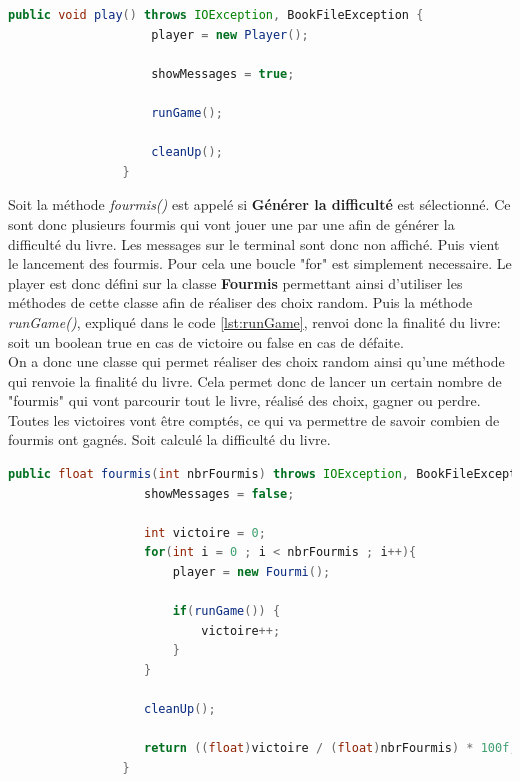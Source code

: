 			\begin{lstlisting}[gobble=16, language=java, caption=play()]
				public void play() throws IOException, BookFileException {
					player = new Player();

					showMessages = true;

					runGame();

					cleanUp();
				}
			\end{lstlisting}

			Soit la méthode \textit{fourmis()} est appelé si \textbf{Générer la difficulté} est sélectionné. Ce sont donc plusieurs fourmis qui vont jouer une par une afin de générer la difficulté du livre. Les messages sur le terminal sont donc non affiché. Puis vient le lancement des fourmis. Pour cela une boucle "for" est simplement necessaire. Le player est donc défini sur la classe \textbf{Fourmis} permettant ainsi d'utiliser les méthodes de cette classe afin de réaliser des choix random. Puis la méthode \textit{runGame()}, expliqué dans le code \ref{lst:runGame}, renvoi donc la finalité du livre: soit un boolean true en cas de victoire ou false en cas de défaite.\\
			On a donc une classe qui permet réaliser des choix random ainsi qu'une méthode qui renvoie la finalité du livre. Cela permet donc de lancer un certain nombre de "fourmis" qui vont parcourir tout le livre, réalisé des choix, gagner ou perdre. Toutes les victoires vont être comptés, ce qui va permettre de savoir combien de fourmis ont gagnés. Soit calculé la difficulté du livre.

			\begin{lstlisting}[gobble=16, language=java, caption=fourmis()]
				public float fourmis(int nbrFourmis) throws IOException, BookFileException {
				   showMessages = false;

				   int victoire = 0;
				   for(int i = 0 ; i < nbrFourmis ; i++){
					   player = new Fourmi();

					   if(runGame()) {
						   victoire++;
					   }
				   }

				   cleanUp();

				   return ((float)victoire / (float)nbrFourmis) * 100f;
				}
			\end{lstlisting}

